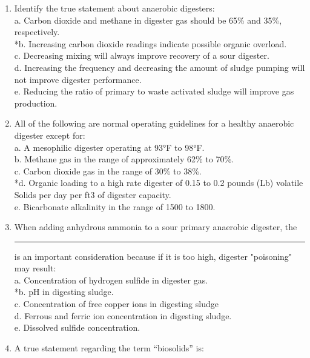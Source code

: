 \documentclass{article}
\begin{document}
\begin{enumerate}
\item  Identify the true statement about anaerobic digesters: \\

a. Carbon dioxide and methane in digester gas should be 65\% and 35\%, respectively. \\
*b. Increasing carbon dioxide readings indicate possible organic overload. \\
c. Decreasing mixing will always improve recovery of a sour digester. \\
d. Increasing the frequency and decreasing the amount of sludge pumping will not improve digester performance. \\
e. Reducing the ratio of primary to waste activated sludge will improve gas production. \\

\item  All of the following are normal operating guidelines for a healthy anaerobic digester except for: \\

a. A mesophilic digester operating at 93°F to 98°F. \\
b. Methane gas in the range of approximately 62\% to 70\%. \\
c. Carbon dioxide gas in the range of 30\% to 38\%. \\
*d. Organic loading to a high rate digester of 0.15 to 0.2 pounds (Lb) volatile Solids per day per ft3 of digester capacity. \\
e. Bicarbonate alkalinity in the range of 1500 to 1800. \\

\item  When adding anhydrous ammonia to a sour primary anaerobic digester, the \rule{1.5cm}{0.3mm} is an important consideration because if it is too high, digester "poisoning" may result: \\

a. Concentration of hydrogen sulfide in digester gas. \\
*b. pH in digesting sludge. \\
c. Concentration of free copper ions in digesting sludge \\
d. Ferrous and ferric ion concentration in digesting sludge. \\
e. Dissolved sulfide concentration. \\

\item  A true statement regarding the term “biosolids” is: \\


\end{enumerate}
\end{document}
